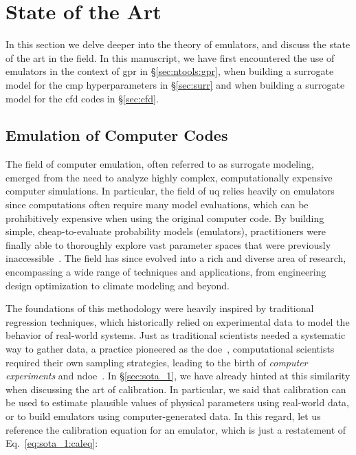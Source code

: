 %
\chapter{State of the Art}
\label{sec:sota_2}


In this section we delve deeper into the theory of emulators, and discuss the state of the art in the field. In this manuscript, we have first encountered the use of emulators in the context of \gls{gpr} in \S\ref{sec:ntools:gpr}, when building a surrogate model for the \gls{cmp} hyperparameters in \S\ref{sec:surr} and when building a surrogate model for the \gls{cfd} codes in \S\ref{sec:cfd}.

\section{Emulation of Computer Codes}

The field of computer emulation, often referred to as surrogate modeling, emerged from the need to analyze highly complex, computationally expensive computer simulations. In particular, the field of \gls{uq} relies heavily on emulators since computations often require many model evaluations, which can be prohibitively expensive when using the original computer code. By building simple, cheap-to-evaluate probability models (emulators), practitioners were finally able to thoroughly explore vast parameter spaces that were previously inaccessible~\cite{santner2003}. The field has since evolved into a rich and diverse area of research, encompassing a wide range of techniques and applications, from engineering design optimization to climate modeling and beyond.

\smallskip
The foundations of this methodology were heavily inspired by traditional regression techniques, which historically relied on experimental data to model the behavior of real-world systems. Just as traditional scientists needed a systematic way to gather data, a practice pioneered as the \gls{doe}~\cite{fisher1925}, computational scientists required their own sampling strategies, leading to the birth of \textit{computer experiments} and \gls{ndoe}~\cite{mckay1979}. In \S\ref{sec:sota_1}, we have already hinted at this similarity when discussing the art of calibration. In particular, we said that calibration can be used to estimate plausible values of physical parameters using real-world data, or to build emulators using computer-generated data. In this regard, let us reference the calibration equation for an emulator, which is just a restatement of Eq.~\eqref{eq:sota_1:caleq}:

